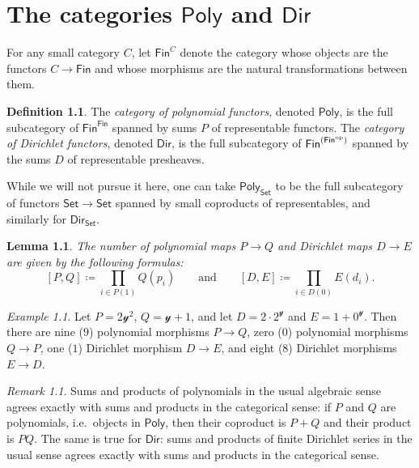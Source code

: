 \documentclass[11pt, article, one side]{memoir}
\theoremstyle{theorem}
\newtheorem{lemma}[section]{Lemma}
\theoremstyle{definition}
\newtheorem{definition}[section]{Definition}
\theoremstyle{remark}
\newtheorem{example}[section]{Example}
\newtheorem{remark}[section]{Remark}
\newcommand{\Cat}[1]{\mathsf{#1}}%
\newcommand{\op}{^\tn{op}}
\newcommand{\tn}[1]{\textnormal{#1}}
\newcommand{\smset}{\Cat{Set}}
\newcommand{\finset}{\Cat{Fin}}
\newcommand{\yon}{\mathcal{y}}
\newcommand{\poly}{\Cat{Poly}}
\newcommand{\dir}{\Cat{Dir}}
\newcommand{\qqand}{\qquad\text{and}\qquad}
\begin{document}
\chapter{The categories $\poly$ and $\dir$}

For any small category $C$, let $\finset^C$ denote the category whose objects are the functors $C\to\finset$ and whose morphisms are the natural transformations between them.
\begin{definition}\label{def.poly_dir}
The \emph{category of polynomial functors}, denoted $\poly$, is the full subcategory of $\finset^\finset$ spanned by sums $P$ of representable functors. The \emph{category of Dirichlet functors}, denoted $\dir$, is the full subcategory of $\finset^{(\finset\op)}$ spanned by the sums $D$ of representable presheaves.
\end{definition}

While we will not pursue it here, one can take $\poly_\smset$ to be the full subcategory of functors $\smset\to\smset$ spanned by small coproducts of representables, and similarly for $\dir_\smset$.

\begin{lemma}
The number of polynomial maps $P\to Q$ and Dirichlet maps $D\to E$ are given by the following formulas:
\[
  [P, Q]\coloneqq\prod_{i\in P(1)}Q(p_i)
  \qqand
  [D, E]\coloneqq\prod_{i\in D(0)}E(d_i).
\]
\end{lemma}

\begin{example}
Let $P=2\yon^2$, $Q=\yon+1$, and let $D=2\cdot2^\yon$ and $E=1+0^\yon$. Then there are nine ($9$) polynomial morphisms $P\to Q$, zero ($0$) polynomial morphisms $Q\to P$, one ($1$) Dirichlet morphism $D\to E$, and eight ($8$) Dirichlet morphisms $E\to D$.
\end{example}

\begin{remark}\label{rem.products_coproducts}
Sums and products of polynomials in the usual algebraic sense agrees exactly with sums and products in the categorical sense: if $P$ and $Q$ are polynomials, i.e.\ objects in $\poly$, then their coproduct is $P+Q$ and their product is $PQ$. The same is true for $\dir$: sums and products of finite Dirichlet series in the usual sense agrees exactly with sums and products in the categorical sense.
\end{remark}
\end{document}
